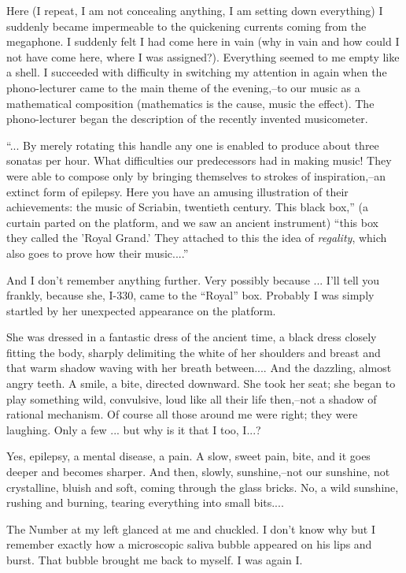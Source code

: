 \documentclass[11pt,openany]{book}
\begin{document}
Here (I repeat, I am not concealing anything, I am setting down everything) I suddenly became impermeable to the quickening currents coming from the megaphone. I suddenly felt I had come here in vain (why in vain and how could I not have come here, where I was assigned?). Everything seemed to me empty like a shell. I succeeded with difficulty in switching my attention in again when the phono-lecturer came to the main theme of the evening,--to our music as a mathematical composition (mathematics is the cause, music the effect). The phono-lecturer began the description of the recently invented musicometer.

``... By merely rotating this handle any one is enabled to produce about three sonatas per hour. What difficulties our predecessors had in making music! They were able to compose only by bringing themselves to strokes of inspiration,--an extinct form of epilepsy. Here you have an amusing illustration of their achievements: the music of Scriabin, twentieth century. This black box,'' (a curtain parted on the platform, and we saw an ancient instrument) ``this box they called the 'Royal Grand.' They attached to this the idea of \emph{regality}, which also goes to prove how their music....''

And I don't remember anything further. Very possibly because ... I'll tell you frankly, because she, I-330, came to the ``Royal'' box. Probably I was simply startled by her unexpected appearance on the platform.

She was dressed in a fantastic dress of the ancient time, a black dress closely fitting the body, sharply delimiting the white of her shoulders and breast and that warm shadow waving with her breath between.... And the dazzling, almost angry teeth. A smile, a bite, directed downward. She took her seat; she began to play something wild, convulsive, loud like all their life then,--not a shadow of rational mechanism. Of course all those around me were right; they were laughing. Only a few ... but why is it that I too, I...?

Yes, epilepsy, a mental disease, a pain. A slow, sweet pain, bite, and it goes deeper and becomes sharper. And then, slowly, sunshine,--not our sunshine, not crystalline, bluish and soft, coming through the glass bricks. No, a wild sunshine, rushing and burning, tearing everything into small bits....

The Number at my left glanced at me and chuckled. I don't know why but I remember exactly how a microscopic saliva bubble appeared on his lips and burst. That bubble brought me back to myself. I was again I.
\end{document}
